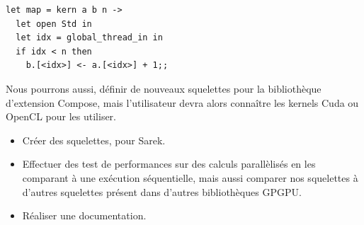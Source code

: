 \documentclass{report}
\begin{document}
\begin{lstlisting}
let map = kern a b n ->
  let open Std in
  let idx = global_thread_in in
  if idx < n then
    b.[<idx>] <- a.[<idx>] + 1;;
\end{lstlisting}

Nous pourrons aussi, définir de nouveaux squelettes pour la bibliothèque d’extension Compose, mais l’utilisateur devra alors connaître les kernels Cuda ou OpenCL pour les utiliser. 

\begin{itemize}
\item Créer des squelettes, pour Sarek.
\item Effectuer des test de performances sur des calculs parallèlisés en les comparant à une exécution séquentielle, mais aussi comparer nos squelettes à d’autres squelettes présent dans d’autres bibliothèques GPGPU.
\item Réaliser une documentation.
\end{itemize}



\end{document}
